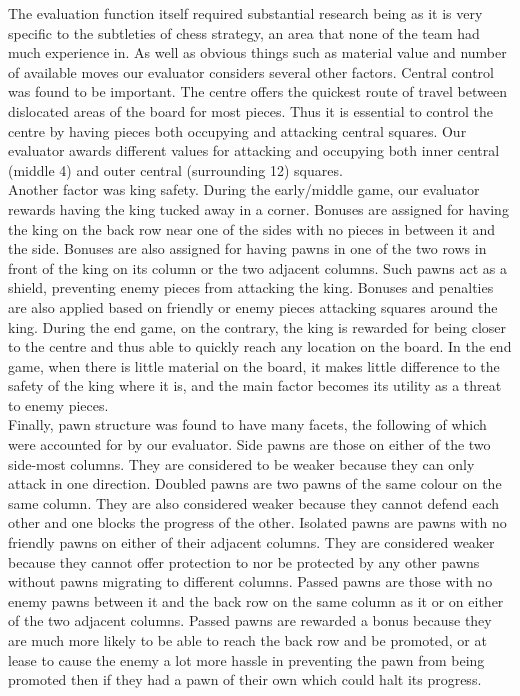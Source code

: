 \documentclass{l3proj}
\begin{document}
The evaluation function itself required substantial research being as it is very specific to the subtleties of chess strategy, an area that none of the team had much experience in. As well as obvious things such as material value and number of available moves our evaluator considers several other factors. Central control was found to be important. The centre offers the quickest route of travel between dislocated areas of the board for most pieces. Thus it is essential to control the centre by having pieces both occupying and attacking central squares. Our evaluator awards different values for attacking and occupying both inner central (middle 4) and outer central (surrounding 12) squares.\\

Another factor was king safety. During the early/middle game, our evaluator rewards having the king tucked away in a corner. Bonuses are assigned for having the king on the back row near one of the sides with no pieces in between it and the side. Bonuses are also assigned for having pawns in one of the two rows in front of the king on its column or the two adjacent columns. Such pawns act as a shield, preventing enemy pieces from attacking the king. Bonuses and penalties are also applied based on friendly or enemy pieces attacking squares around the king. During the end game, on the contrary, the king is rewarded for being closer to the centre and thus able to quickly reach any location on the board. In the end game, when there is little material on the board, it makes little difference to the safety of the king where it is, and the main factor becomes its utility as a threat to enemy pieces.\\

Finally, pawn structure was found to have many facets, the following of which were accounted for by our evaluator. Side pawns are those on either of the two side-most columns. They are considered to be weaker because they can only attack in one direction. Doubled pawns are two pawns of the same colour on the same column. They are also considered weaker because they cannot defend each other and one blocks the progress of the other. Isolated pawns are pawns with no friendly pawns on either of their adjacent columns. They are considered weaker because they cannot offer protection to nor be protected by any other pawns without pawns migrating to different columns. Passed pawns are those with no enemy pawns between it and the back row on the same column as it or on either of the two adjacent columns. Passed pawns are rewarded a bonus because they are much more likely to be able to reach the back row and be promoted, or at lease to cause the enemy a lot more hassle in preventing the pawn from being promoted then if they had a pawn of their own which could halt its progress. \\
\end{document}
